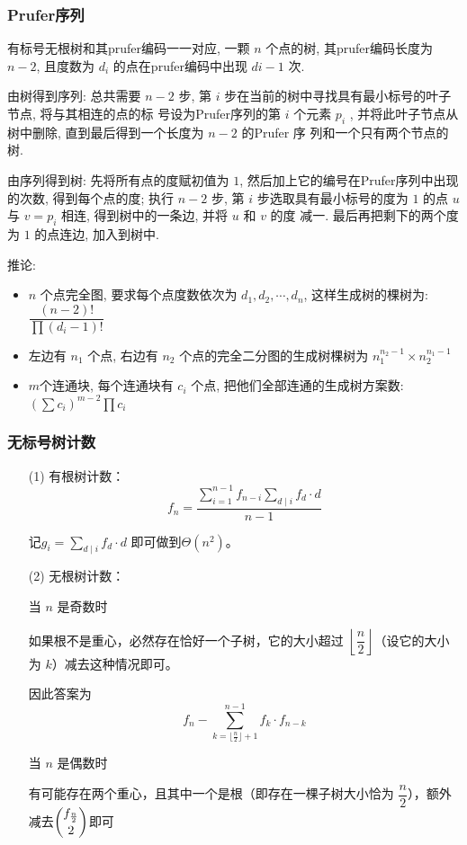 \subsubsection{Prufer序列}
有标号无根树和其prufer编码一一对应, 一颗 $n$ 个点的树, 其prufer编码长度为 $n - 2$, 且度数为 $d_i$ 的点在prufer编码中出现 $di - 1$ 次.

由树得到序列: 总共需要 $n - 2$ 步, 第 $i$ 步在当前的树中寻找具有最小标号的叶子节点, 将与其相连的点的标
号设为Prufer序列的第 $i$ 个元素 $p_i$ , 并将此叶子节点从树中删除, 直到最后得到一个长度为 $n - 2$ 的Prufer 序
列和一个只有两个节点的树.

由序列得到树: 先将所有点的度赋初值为 $1$, 然后加上它的编号在Prufer序列中出现的次数, 得到每个点的度;
执行 $n - 2$ 步, 第 $i$ 步选取具有最小标号的度为 $1$ 的点 $u$ 与 $v = p_i$ 相连, 得到树中的一条边, 并将 $u$ 和 $v$ 的度
减一. 最后再把剩下的两个度为 $1$ 的点连边, 加入到树中.

推论:

\begin{itemize}
    \item $n$ 个点完全图, 要求每个点度数依次为 $d_1, d_2 ,\cdots,d_n$, 这样生成树的棵树为: $\dfrac{(n-2)!}{\prod (d_i-1)!}$
    \item 左边有 $n_1$ 个点, 右边有 $n_2$ 个点的完全二分图的生成树棵树为 $n_1^{n_2-1}\times n_2^{n_1-1}$
    \item $m$个连通块, 每个连通块有 $c_i$ 个点, 把他们全部连通的生成树方案数: $(\sum c_i)^{m-2} \prod c_i$
\end{itemize}

\subsubsection{无标号树计数}
\begin{enumerate}
    \item[(1)]有根树计数： $$f_n = \dfrac{ \sum_{i=1}^{n-1} f_{n-i} \sum_{d \mid i} f_d \cdot d}{n-1}$$
    
    记$g_i = \sum_{d \mid i} f_d \cdot d$ 即可做到$\Theta(n^2)$。
    \item[(2)]无根树计数：
    
    当 $n$ 是奇数时

    如果根不是重心，必然存在恰好一个子树，它的大小超过 $\left\lfloor\dfrac n2\right\rfloor$（设它的大小为 $k$）减去这种情况即可。
    
    因此答案为
    $$f_n-\sum_{k=\lfloor\frac n2\rfloor+1}^{n-1}f_k\cdot f_{n-k}$$
    
    当 $n$ 是偶数时
    
    有可能存在两个重心，且其中一个是根（即存在一棵子树大小恰为 $\dfrac n2$），额外减去$\dbinom{f_{\frac n2}}2$即可
\end{enumerate}


